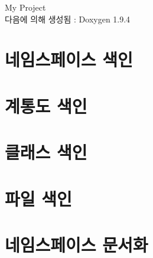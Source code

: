 \documentclass[twoside]{book}
\newcommand{\+}{\discretionary{\mbox{\scriptsize$\hookleftarrow$}}{}{}}
\newcommand{\clearemptydoublepage}{%
    \newpage{\pagestyle{empty}\cleardoublepage}%
  }
\begin{document}
  \raggedbottom
    \hypersetup{pageanchor=false,
                bookmarksnumbered=true,
                pdfencoding=unicode
               }
  \begin{titlepage}
  \vspace*{7cm}
  \begin{center}%
  {\Large My Project}\\
  \vspace*{1cm}
  {\large 다음에 의해 생성됨 \+:  Doxygen 1.9.4}\\
  \end{center}
  \end{titlepage}
  \clearemptydoublepage
  \tableofcontents
  \clearemptydoublepage
  \hypersetup{pageanchor=true}
\chapter{네임스페이스 색인}

\chapter{계통도 색인}

\chapter{클래스 색인}

\chapter{파일 색인}

\chapter{네임스페이스 문서화}




\end{document}
